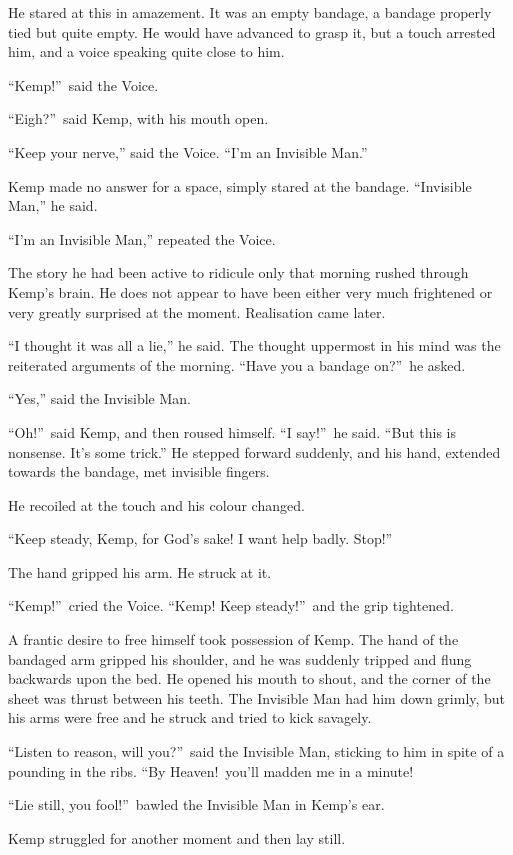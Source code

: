 He stared at this in amazement. It was an empty bandage, a bandage properly tied but quite empty. He would have advanced to grasp it, but a touch arrested him, and a voice speaking quite close to him.

“Kemp!”\ said the Voice.

“Eigh?”\ said Kemp, with his mouth open.

“Keep your nerve,” said the Voice. “I’m an Invisible Man.”

Kemp made no answer for a space, simply stared at the bandage. “Invisible Man,” he said.

“I’m an Invisible Man,” repeated the Voice.

The story he had been active to ridicule only that morning rushed through Kemp’s brain. He does not appear to have been either very much frightened or very greatly surprised at the moment. Realisation came later.

“I thought it was all a lie,” he said. The thought uppermost in his mind was the reiterated arguments of the morning. “Have you a bandage on?”\ he asked.

“Yes,” said the Invisible Man.

“Oh!”\ said Kemp, and then roused himself. “I say!”\ he said. “But this is nonsense. It’s some trick.” He stepped forward suddenly, and his hand, extended towards the bandage, met invisible fingers.

He recoiled at the touch and his colour changed.

“Keep steady, Kemp, for God’s sake! I want help badly. Stop!”

The hand gripped his arm. He struck at it.

“Kemp!”\ cried the Voice. “Kemp! Keep steady!”\ and the grip tightened.

A frantic desire to free himself took possession of Kemp. The hand of the bandaged arm gripped his shoulder, and he was suddenly tripped and flung backwards upon the bed. He opened his mouth to shout, and the corner of the sheet was thrust between his teeth. The Invisible Man had him down grimly, but his arms were free and he struck and tried to kick savagely.

“Listen to reason, will you?”\ said the Invisible Man, sticking to him in spite of a pounding in the ribs. “By Heaven!\ you’ll madden me in a minute!

“Lie still, you fool!”\ bawled the Invisible Man in Kemp’s ear.

Kemp struggled for another moment and then lay still.

